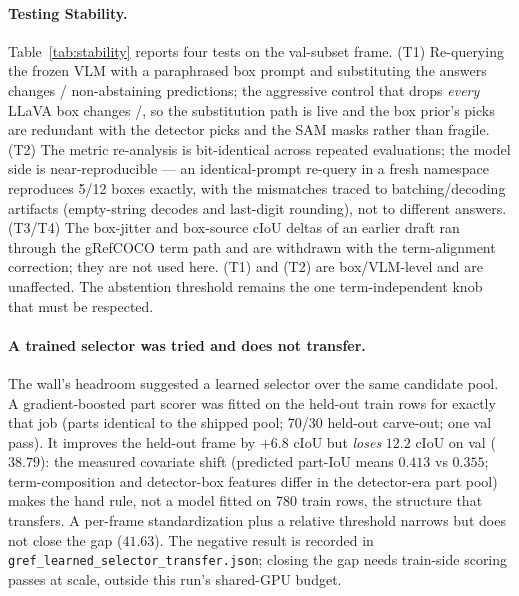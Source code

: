\begin{table}[t]\centering\small
\caption{Parameter sensitivity of the RefCOCO-family rule: shipped value and
the range of the reported metric across each sweep (\S\ref{sec:analysis}).
The gRefCOCO sweeps of an earlier draft are withdrawn (term-alignment
correction, \S\ref{sec:gref}).}\label{tab:sensitivity}

\end{table}

\paragraph{Testing Stability.}
Table~\ref{tab:stability} reports four tests on the val-subset frame. (T1)
Re-querying the frozen VLM with a paraphrased box prompt and substituting the
answers changes \stabParaChanged{}/\stabParaN{} non-abstaining predictions;
the aggressive control that drops \emph{every} LLaVA box changes
\stabControlChanged{}/\stabParaN{}, so the substitution path is live and the
box prior's picks are redundant with the detector picks and the SAM masks
rather than fragile. (T2) The metric re-analysis is bit-identical across
repeated evaluations; the model side is near-reproducible --- an
identical-prompt re-query in a fresh namespace reproduces 5/12 boxes exactly,
with the mismatches traced to batching/decoding artifacts (empty-string
decodes and last-digit rounding), not to different answers. (T3/T4) The box-jitter and box-source cIoU deltas of an
earlier draft ran through the gRefCOCO term path and are withdrawn with the
term-alignment correction; they are not used here. (T1) and (T2) are
box/VLM-level and are unaffected. The abstention threshold remains the one
term-independent knob that must be respected.

\begin{table}[t]\centering\small
\caption{Testing Stability (\S\ref{sec:analysis}).}\label{tab:stability}

\end{table}

\paragraph{A trained selector was tried and does not transfer.}
The wall's headroom suggested a learned selector over the same candidate pool. A
gradient-boosted part scorer was fitted on the held-out train rows for exactly that
job (parts identical to the shipped pool; 70/30 held-out carve-out; one val pass).
It improves the held-out frame by $+6.8$ cIoU but \emph{loses} $12.2$ cIoU on val
($38.79$): the measured covariate shift (predicted part-IoU means $0.413$ vs $0.355$;
term-composition and detector-box features differ in the detector-era part pool) makes the hand rule, not a model
fitted on 780 train rows, the structure that transfers. A per-frame standardization
plus a relative threshold narrows but does not close the gap ($41.63$). The negative
result is recorded in \texttt{gref\_learned\_selector\_transfer.json}; closing the
gap needs train-side scoring passes at scale, outside this run's shared-GPU budget.

